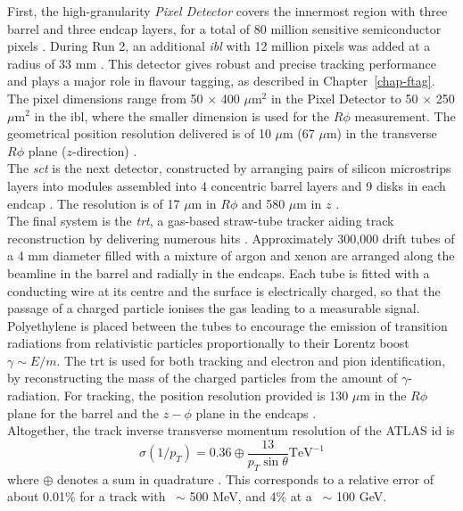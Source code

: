 First, the high-granularity \textit{Pixel Detector} covers the innermost region with three barrel and three endcap layers, for a total of 80 million sensitive semiconductor pixels \cite{CERN-LHCC-97-016, Potamianos:2015lar}. During Run 2, an additional \textit{\gls{ibl}} with 12 million pixels was added at a radius of 33 mm \cite{Capeans:1291633}. This detector gives robust and precise tracking performance and plays a major role in flavour tagging, as described in Chapter~\ref{chap-ftag}. The pixel dimensions range from 50 $\times$ 400 $\mu$m$^2$ in the Pixel Detector to 50 $\times$ 250 $\mu$m$^2$ in the \gls{ibl}, where the smaller dimension is used for the $R\phi$ measurement. The geometrical position resolution delivered is of 10 $\mu$m (67 $\mu$m) in the transverse $R\phi$ plane ($z$-direction) \cite{Pernegger_2015, ATL-INDET-PUB-2016-001}. \\

The \textit{\gls{sct}} is the next detector, constructed by arranging pairs of silicon microstrips layers into modules assembled into 4 concentric barrel layers and 9 disks in each endcap \cite{AHMAD200798, CERN-LHCC-2017-005}. The resolution is of 17 $\mu$m in $R\phi$ and 580 $\mu$m in $z$ \cite{ATLASSCT}. \\

The final system is the \textit{\gls{trt}}, a gas-based straw-tube tracker aiding track reconstruction by delivering numerous hits \cite{TheATLASTRTcollaboration_2008}. Approximately 300,000 drift tubes of a 4 mm diameter filled with a mixture of argon and xenon are arranged along the beamline in the barrel and radially in the endcaps. Each tube is fitted with a conducting wire at its centre and the surface is electrically charged, so that the passage of a charged particle ionises the gas leading to a measurable signal. Polyethylene is placed between the tubes to encourage the emission of transition radiations from relativistic particles proportionally to their Lorentz boost $\gamma \sim E / m$. The \gls{trt} is used for both tracking and electron and pion identification, by reconstructing the mass of the charged particles from the amount of $\gamma$-radiation. For tracking, the position resolution provided is 130 $\mu$m in the $R\phi$ plane for the barrel and the $z-\phi$ plane in the endcaps \cite{Vogel:1537991}. \\

Altogether, the track inverse transverse momentum resolution of the ATLAS \gls{id} is
\begin{equation}
  \sigma(1 / p_T) = 0.36 \oplus \frac{13}{p_T \sin\theta} \text{TeV}^{-1}
\end{equation}
where $\oplus$ denotes a sum in quadrature \cite{TheATLASCollaboration_2008}. This corresponds to a relative error of about 0.01\% for a track with \pt\ $\sim$ 500 MeV, and 4\% at a \pt\ $\sim$ 100 GeV.

